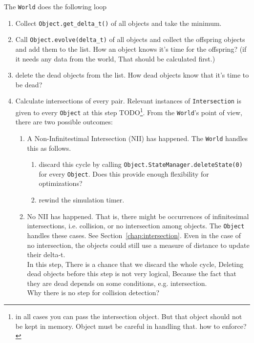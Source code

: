 \documentclass[a4paper]{report}
\newcommand{\cm}[1]{{\color{red}#1}}
\newcommand{\ai}[1]{{\color{blue}#1}}
\begin{document}
The \verb+World+ does the following loop
\begin{enumerate}
	\item Collect \verb+Object.get_delta_t()+ of all objects and take the minimum.
	\item Call \verb+Object.evolve(delta_t)+ of all objects and collect the offspring objects and add them to the list.
	\cm{How an object knows it's time for the offspring? (if it needs any data from the world, That should be calculated first.)}
	\item delete the dead objects from the list.
	\cm{How dead objects know that it's time to be dead?}
	\item Calculate intersections of every pair. Relevant instances of \verb+Intersection+ is given to every \verb+Object+ at this step TODO\footnote{\ai{in all cases you can pass the intersection object. But that object should not be kept in memory. Object must be careful in handling that. how to enforce?}}. From the \verb+World+'s point of view, there are two possible outcomes:
	\begin{enumerate}
		\item A Non-Infinitestimal Intersection (NII) has happened. The \verb+World+ handles this as follows. 
		\begin{enumerate}
			\item discard this cycle by calling \verb+Object.StateManager.deleteState(0)+ for every \verb+Object+. \cm{Does this provide enough flexibility for optimizations?}
			\item rewind the simulation timer.
		\end{enumerate}
		\item No NII has happened. That is, there might be occurrences of infinitesimal intersections, i.e. collision, or no intersection among objects. The \verb+Object+ handles these cases. See Section~\ref{chap:intersection}. \cm{Even in the case of no intersection, the objects could still use a measure of distance to update their delta-t.}\\
		\cm{In this step, There is a chance that we discard the whole cycle, Deleting dead objects before this step is not very logical, Because the fact that they are dead depends on some conditions, e.g. intersection. }\\
		
		
		\cm{Why there is no step for collision detection?}
	\end{enumerate}
\end{enumerate}
\end{document}
